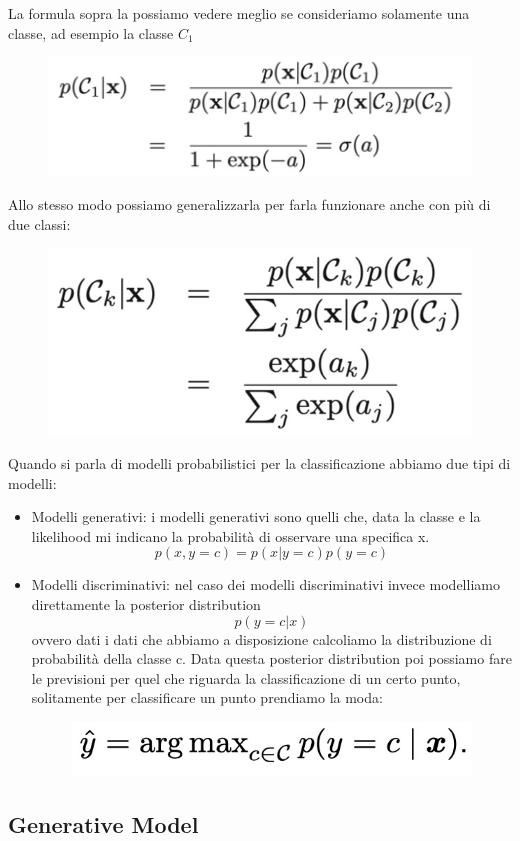 \documentclass[14pt]{extreport}
\begin{document}
La formula sopra la possiamo vedere meglio se consideriamo solamente una classe, ad esempio la classe $C_1$

\begin{figure}[H]
	\centering
	\includegraphics[width=0.5\linewidth]{199.jpeg}
\end{figure}

Allo stesso modo possiamo generalizzarla per farla funzionare anche con più di due classi:

\begin{figure}[H]
	\centering
	\includegraphics[width=0.34\linewidth]{200.jpeg}
\end{figure}

Quando si parla di modelli probabilistici per la classificazione abbiamo due tipi di modelli:
\begin{itemize}
	\item Modelli generativi: i modelli generativi sono quelli che, data la classe e la likelihood mi indicano la probabilità di osservare una
	specifica x. $$p(x, y=c) = p(x|y=c)p(y=c)$$
	\item Modelli discriminativi: nel caso dei modelli discriminativi invece modelliamo direttamente la posterior distribution $$p(y=c|x)$$ ovvero
	      dati i dati che abbiamo a disposizione calcoliamo la distribuzione di probabilità della classe c. Data questa posterior distribution poi
	      possiamo fare le previsioni per quel che riguarda la classificazione di un certo punto, solitamente per classificare un punto prendiamo la
	      moda: \begin{figure}[H]
		      \centering
		      \includegraphics[width=0.5\linewidth]{157.jpeg}
	      \end{figure}
\end{itemize}

\subsection{Generative Model}
\end{document}
